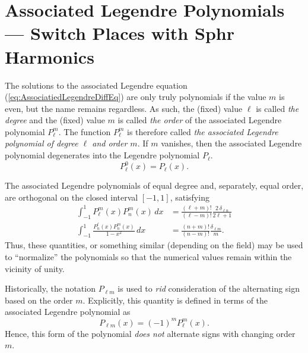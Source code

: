 \documentclass[11pt,dvipsnames]{thesis}
\begin{document}


\section{Associated Legendre Polynomials --- Switch Places with Sphr Harmonics}
The solutions to the associated Legendre equation (\ref{eq:AssociatiedLegendreDiffEq}) are only truly polynomials if the value $m$ is even, but the name remains regardless. As such, the (fixed) value $\ell$ is called \textit{the degree} and the (fixed) value $m$ is called \textit{the order} of the associated Legendre polynomial $P_\ell^m$. The function $P_\ell^m$ is therefore called \textit{the associated Legendre polynomial of degree $\ell$ and order $m$}. If $m$ vanishes, then the associated Legendre polynomial degenerates into the Legendre polynomial $P_\ell$.
\begin{equation}
P_\ell^0(x) = P_\ell(x).
\end{equation}

The associated Legendre polynomials of equal degree and, separately, equal order, are orthogonal on the closed interval $[-1, 1]$, satisfying
\begin{align}
\int_{-1}^1 P_\ell^m(x) P_n^m(x) \, dx &= \frac{(\ell + m)!}{(\ell - m)!} \frac{2 \,\delta_{\ell n}}{2\ell + 1} \\
\int_{-1}^1 \frac{P_n^\ell(x) P_n^m(x)}{1 - x^2} \,dx &= \frac{(n + m)!}{(n - m)!} \frac{\delta_{\ell m}}{m}.
\end{align}
Thus, these quantities, or something similar (depending on the field) may be used to ``normalize'' the polynomials so that the numerical values remain within the vicinity of unity.

Historically, the notation $P_{\ell m}$ is used to \textit{rid} consideration of the alternating sign based on the order $m$. Explicitly, this quantity is defined in terms of the associated Legendre polynomial as
\begin{equation}
P_{\ell m}(x) = (-1)^m P_\ell^m(x).
\end{equation}
Hence, this form of the polynomial \textit{does not} alternate signs with changing order $m$.
\end{document}
